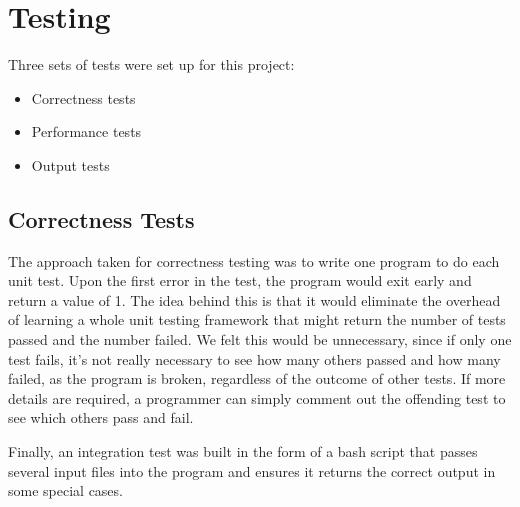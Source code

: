 \section{Testing}
Three sets of tests were set up for this project:
\begin{itemize}
  \item Correctness tests
  \item Performance tests
  \item Output tests
\end{itemize}

\subsection{Correctness Tests}
The approach taken for correctness testing was to write one program to
do each unit test.
Upon the first error in the test, the program would exit early and return
a value of 1.
The idea behind this is that it would eliminate the overhead of learning
a whole unit testing framework that might return the number of tests passed
and the number failed.
We felt this would be unnecessary, since if only one test fails, it's not
really necessary to see how many others passed and how many failed, as the
program is broken, regardless of the outcome of other tests.
If more details are required, a programmer can simply comment out the offending
test to see which others pass and fail.

Finally, an integration test was built in the form of a bash script that
passes several input files into the program and ensures it returns the
correct output in some special cases.

